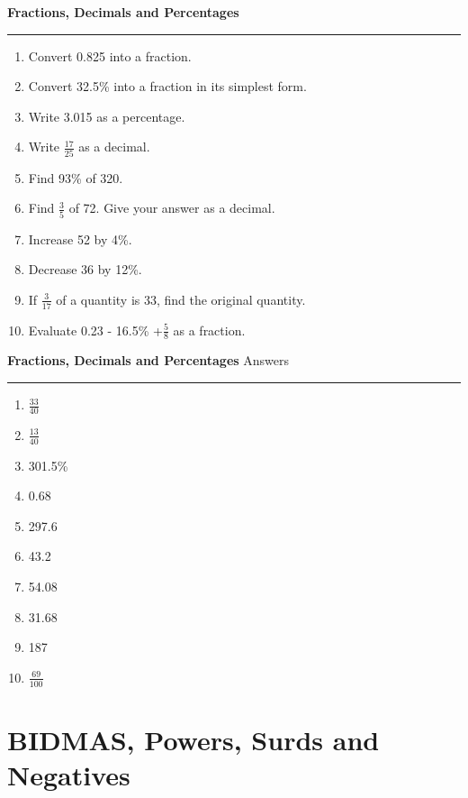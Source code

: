 \documentclass[12pt]{article}
\begin{document}
\newpage

\noindent \textbf{Fractions, Decimals and Percentages}

\medskip

\hrule 

\medskip

\begin{enumerate}
    \item Convert 0.825 into a fraction.
    \item Convert 32.5\% into a fraction in its simplest form.
    \item Write 3.015 as a percentage.
    \item Write \(\frac{17}{25}\) as a decimal.
    \item Find 93\% of 320.
    \item Find \(\frac{3}{5}\) of 72. Give your answer as a decimal.
    \item Increase 52 by 4\%.
    \item Decrease 36 by 12\%.
    \item If \(\frac{3}{17}\) of a quantity is 33, find the original quantity.
    \item Evaluate 0.23 - 16.5\% +\(\frac{5}{8}\) as a fraction.
\end{enumerate}

\newpage

\noindent \textbf{Fractions, Decimals and Percentages} \hfill Answers

\medskip

\hrule 

\medskip

\begin{enumerate}
    \item \(\frac{33}{40}\)
    \item \(\frac{13}{40}\)
    \item 301.5\%
    \item 0.68
    \item 297.6
    \item 43.2
    \item 54.08
    \item 31.68
    \item 187
    \item \(\frac{69}{100}\)
\end{enumerate}

\newpage

\section{BIDMAS, Powers, Surds and Negatives}
\end{document}
